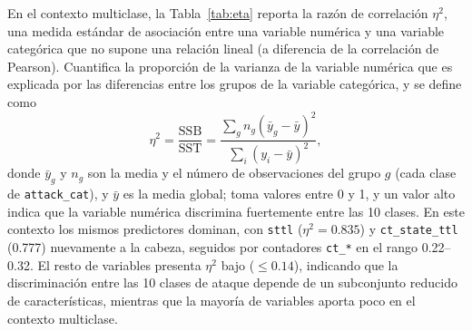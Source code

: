 \documentclass[conference]{IEEEtran}
\begin{document}
En el contexto multiclase, la Tabla~\ref{tab:eta} reporta la razón de correlación $\eta^{2}$, una medida estándar de asociación entre una variable numérica y una variable categórica que no supone una relación lineal (a diferencia de la correlación de Pearson). Cuantifica la proporción de la varianza de la variable numérica que es explicada por las diferencias entre los grupos de la variable categórica, y se define como
\begin{equation}
    \eta^{2} = \frac{\mathrm{SSB}}{\mathrm{SST}} = \frac{\sum_{g} n_{g}(\bar{y}_{g} - \bar{y})^{2}}{\sum_{i} (y_{i} - \bar{y})^{2}},
\end{equation}
donde $\bar{y}_{g}$ y $n_{g}$ son la media y el número de observaciones del grupo $g$ (cada clase de \texttt{attack\_cat}), y $\bar{y}$ es la media global; toma valores entre 0 y 1, y un valor alto indica que la variable numérica discrimina fuertemente entre las 10 clases. En este contexto los mismos predictores dominan, con \texttt{sttl} ($\eta^2 = 0.835$) y \texttt{ct\_state\_ttl} (0.777) nuevamente a la cabeza, seguidos por contadores \texttt{ct\_*} en el rango 0.22--0.32. El resto de variables presenta $\eta^2$ bajo ($ \leq 0.14$), indicando que la discriminación entre las 10 clases de ataque depende de un subconjunto reducido de características, mientras que la mayoría de variables aporta poco en el contexto multiclase.
\end{document}

